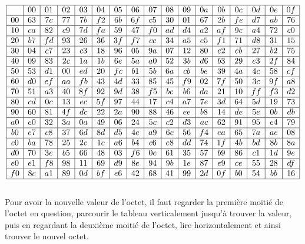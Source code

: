 $$
\begin{array}{|c|c|c|c|c|c|c|c|c|c|c|c|c|c|c|c|c|} \hline
& 00 & 01 & 02 & 03 & 04 & 05 & 06 & 07 & 08 & 09 & 0a & 0b & 0c & 0d & 0e & 0f \\ \hline
00 & 63 & 7c & 77 & 7b & f2 & 6b & 6f & c5 & 30 & 01 & 67 & 2b & fe & d7 & ab & 76 \\ \hline
10 & ca & 82 & c9 & 7d & fa & 59 & 47 & f0 & ad & d4 & a2 & af & 9c & a4 & 72 & c0 \\ \hline
20 & b7 & fd & 93 & 26 & 36 & 3f & f7 & cc & 34 & a5 & e5 & f1 & 71 & d8 & 31 & 15 \\ \hline
30 & 04 & c7 & 23 & c3 & 18 & 96 & 05 & 9a & 07 & 12 & 80 & e2 & eb & 27 & b2 & 75 \\ \hline
40 & 09 & 83 & 2c & 1a & 1b & 6e & 5a & a0 & 52 & 3b & d6 & b3 & 29 & e3 & 2f & 84 \\ \hline
50 & 53 & d1 & 00 & ed & 20 & fc & b1 & 5b & 6a & cb & be & 39 & 4a & 4c & 58 & cf \\ \hline
60 & d0 & ef & aa & fb & 43 & 4d & 33 & 85 & 45 & f9 & 02 & 7f & 50 & 3c & 9f & a8 \\ \hline
70 & 51 & a3 & 40 & 8f & 92 & 9d & 38 & f5 & bc & b6 & da & 21 & 10 & ff & f3 & d2 \\ \hline
80 & cd & 0c & 13 & ec & 5f & 97 & 44 & 17 & c4 & a7 & 7e & 3d & 64 & 5d & 19 & 73 \\ \hline
90 & 60 & 81 & 4f & dc & 22 & 2a & 90 & 88 & 46 & ee & b8 & 14 & de & 5e & 0b & db \\ \hline
a0 & e0 & 32 & 3a & 0a & 49 & 06 & 24 & 5c & c2 & d3 & ac & 62 & 91 & 95 & e4 & 79 \\ \hline
b0 & e7 & c8 & 37 & 6d & 8d & d5 & 4e & a9 & 6c & 56 & f4 & ea & 65 & 7a & ae & 08 \\ \hline
c0 & ba & 78 & 25 & 2e & 1c & a6 & b4 & c6 & e8 & dd & 74 & 1f & 4b & bd & 8b & 8a \\ \hline
d0 & 70 & 3e & b5 & 66 & 48 & 03 & f6 & 0e & 61 & 35 & 57 & b9 & 86 & c1 & 1d & 9e \\ \hline
e0 & e1 & f8 & 98 & 11 & 69 & d9 & 8e & 94 & 9b & 1e & 87 & e9 & ce & 55 & 28 & df \\ \hline
f0 & 8c & a1 & 89 & 0d & bf & e6 & 42 & 68 & 41 & 99 & 2d & 0f & b0 & 54 & bb & 16 \\ \hline
\end{array}
$$ \\

Pour avoir la nouvelle valeur de l'octet, il faut regarder la première moitié de l'octet en question, parcourir le tableau verticalement jusqu'à trouver la valeur, puis en regardant la deuxième moitié de l'octet, lire horizontalement et ainsi trouver le nouvel octet. 

